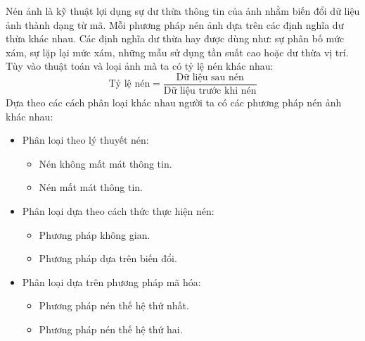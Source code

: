\documentclass[12pt, oneside, a4paper]{book}
\begin{document}
Nén ảnh là kỹ thuật lợi dụng sự dư thừa thông tin của ảnh nhằm biến đổi dữ liệu ảnh thành dạng từ mã. Mỗi phương pháp nén ảnh dựa trên các định nghĩa dư thừa khác nhau. Các định nghĩa dư thừa hay được dùng như: sự phân bố mức xám, sự lặp lại mức xám, những mẫu sử dụng tần suất cao hoặc dư thừa vị trí. Tùy vào thuật toán và loại ảnh mà ta có tỷ lệ nén khác nhau: 
\begin{equation*}
\textrm{Tỷ lệ nén} =\dfrac{\textrm{Dữ liệu sau nén}}{\textrm{Dữ liệu trước khi nén}}
\end{equation*}
Dựa theo các cách phân loại khác nhau người ta có các phương pháp nén ảnh khác nhau:
\begin{itemize}
\item Phân loại theo lý thuyết nén:
\begin{itemize}
\item Nén không mất mát thông tin.
\item Nén mất mát thông tin.
\end{itemize}
\item Phân loại dựa theo cách thức thực hiện nén: 
\begin{itemize}
\item Phương pháp không gian.
\item Phương pháp dựa trên  biến đổi.
\end{itemize}
\item Phân loại dựa trên phương pháp mã hóa:
\begin{itemize}
\item Phương pháp nén thế hệ thứ nhất.
\item Phương pháp nén thế hệ thứ hai.
\end{itemize}
\end{itemize}
%
\end{document}
